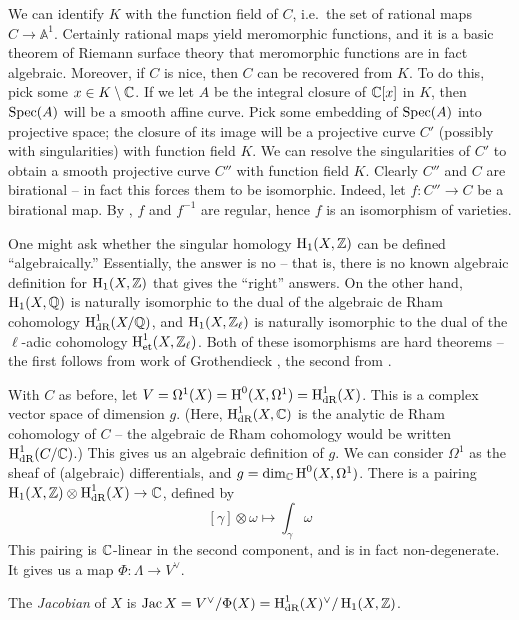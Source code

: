 \documentclass{article}
\begin{document}
\begin{remark}
We can identify $K$ with the function field of $C$, i.e.\ the set of rational 
maps $C\to\mathbb{A}^1$. Certainly rational maps yield meromorphic functions, 
and it is a basic theorem of Riemann surface theory that meromorphic functions 
are in fact algebraic. Moreover, if $C$ is nice, then $C$ can be recovered 
from $K$. To do this, pick some $x\in K\setminus \mathbb{C}$. If we let $A$ be 
the integral closure of $\mathbb{C}[x]$ in $K$, then $\operatorname{Spec}(A)$ will be a 
smooth affine curve. Pick some embedding of $\operatorname{Spec}(A)$ into projective space; 
the closure of its image will be a projective curve $C'$ (possibly with 
singularities) with function field $K$. We can resolve the singularities of 
$C'$ to obtain a smooth projective curve $C''$ with function field $K$. 
Clearly $C''$ and $C$ are birational -- in fact this forces them to be 
isomorphic. Indeed, let $f:C''\to C$ be a birational map. By 
\cite[thm 3.1]{mi}, $f$ and $f^{-1}$ are regular, hence $f$ is an 
isomorphism of varieties. 
\end{remark}

One might ask whether the singular homology $\operatorname{H}_1(X,\mathbb{Z})$ can be 
defined ``algebraically.'' Essentially, the answer is no -- that is, there is 
no known algebraic definition for $\operatorname{H}_1(X,\mathbb{Z})$ that gives the 
``right'' answers. On the other hand, $\operatorname{H}_1(X,\mathbb{Q})$ is naturally 
isomorphic to the dual of the algebraic de Rham cohomology 
$\operatorname{H}_\text{dR}^1(X/\mathbb{Q})$, and $\operatorname{H}_1(X,\mathbb{Z}_\ell)$ is naturally 
isomorphic to the dual of the $\ell$-adic cohomology 
$\operatorname{H}_\text{et}^1(X,\mathbb{Z}_\ell)$. Both of these isomorphisms are hard 
theorems -- the first follows from work of Grothendieck \cite{gr66}, the 
second from \cite[I 4.6.3]{de77}. 

With $C$ as before, let $V=\Omega^1(X)=\operatorname{H}^0(X,\Omega^1)=\operatorname{H}^1_\text{dR}(X)$. 
This is a complex vector space of dimension $g$. (Here, $\operatorname{H}_\text{dR}^1(X,\mathbb{C})$ 
is the analytic de Rham cohomology of $C$ -- the algebraic de Rham cohomology 
would be written $\operatorname{H}_\text{dR}^1(C/\mathbb{C})$.) This gives us an algebraic 
definition of $g$. We can consider $\Omega^1$ as the sheaf of (algebraic) 
differentials, and $g=\dim_{\mathbb{C}}\operatorname{H}^0(X,\Omega^1)$. There is a pairing 
$\operatorname{H}_1(X,\mathbb{Z})\otimes\operatorname{H}_\text{dR}^1(X)\to\mathbb{C}$, defined by 
\[
  [\gamma]\otimes \omega \mapsto \int_\gamma \omega
\]
This pairing is $\mathbb{C}$-linear in the second component, and is in fact 
non-degenerate. It gives us a map $\Phi:\Lambda\to V^\vee$. 

\begin{definition}[analytic]
The \emph{Jacobian} of $X$ is 
$\operatorname{Jac} X=V^\vee/\Phi(X) = \operatorname{H}_\textnormal{dR}^1(X)^\vee/\operatorname{H}_1(X,\mathbb{Z})$. 
\end{definition}
\end{document}
